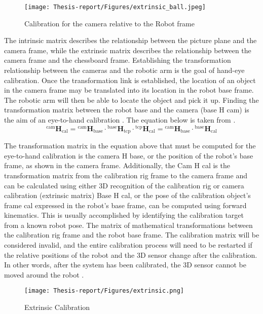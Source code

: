 \documentclass[12pt]{article}
\begin{document}
\begin{figure}[h]
    \centering
    \texttt{[image: Thesis-report/Figures/extrinsic\_ball.jpeg]}
    \caption{Calibration for the camera relative to the Robot frame}
    \label{fig:Photoneo Cmaera}
\end{figure}
The intrinsic matrix describes the relationship between the picture plane and the camera frame, while the extrinsic matrix describes the relationship between the camera frame and the chessboard frame.  Establishing the transformation relationship between the cameras and the robotic arm is the goal of hand-eye calibration.  Once the transformation link is established, the location of an object in the camera frame may be translated into its location in the robot base frame. The robotic arm will then be able to locate the object and pick it up. Finding the transformation matrix between the robot base and the camera (base H cam) is the aim of an eye-to-hand calibration \cite{ref3}. The equation below is taken from \cite{ref3}.\\

 \[
{}^{\text{cam}}\mathbf{H}_{\text{cal}} = {}^{\text{cam}}\mathbf{H}_{\text{base}} \cdot {}^{\text{base}}\mathbf{H}_{\text{tcp}} \cdot {}^{\text{tcp}}\mathbf{H}_{\text{cal}} = {}^{\text{cam}}\mathbf{H}_{\text{base}} \cdot {}^{\text{base}}\mathbf{H}_{\text{cal}} \tag{3}
\]


The transformation matrix in the equation above that must be computed for the eye-to-hand calibration is the camera H base, or the position of the robot's base frame, as shown in the camera frame. Additionally, the Cam H cal is the transformation matrix from the calibration rig frame to the camera frame and can be calculated using either 3D recognition of the calibration rig or camera calibration (extrinsic matrix)  Base H cal, or the pose of the calibration object's frame cal expressed in the robot's base frame, can be computed using forward kinematics. This is usually accomplished by identifying the calibration target from a known robot pose. The matrix of mathematical transformations between the calibration rig frame and the robot base frame. The calibration matrix will be considered invalid, and the entire calibration process will need to be restarted if the relative positions of the robot and the 3D sensor change after the calibration.  In other words, after the system has been calibrated, the 3D sensor cannot be moved around the robot \cite{ref3}.\\


\begin{figure}[h]
    \centering
    \texttt{[image: Thesis-report/Figures/extrinsic.png]}
    \caption{Extrinsic Calibration \cite{ref2} } 
    \label{fig:Photoneo Cmaera}
\end{figure}
\end{document}

